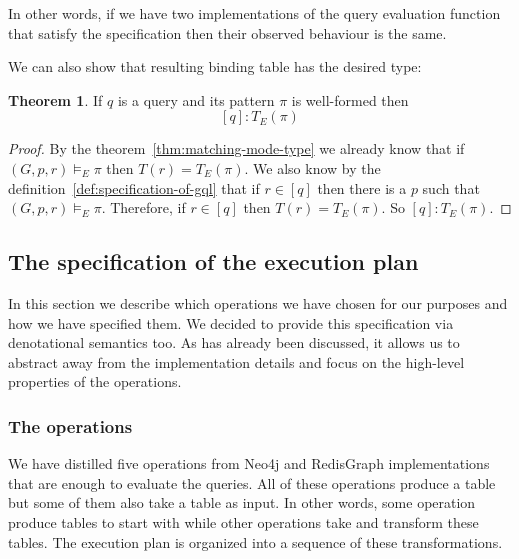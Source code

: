 \documentclass[14pt]{constructor-thesis}
\theoremstyle{definition}
\newtheorem{theorem}{Theorem}
\begin{document}
In other words, if we have two implementations of the query evaluation function that satisfy the specification then their observed behaviour is the same.

We can also show that resulting binding table has the desired type:
\begin{theorem}
  If $q$ is a query and its pattern $\pi$ is well-formed then
  $$[q] : T_E(\pi)$$
\end{theorem}
\begin{proof}
  By the theorem~\ref{thm:matching-mode-type} we already know that if $(G, p, r) \models_E \pi$ then $T(r) = T_E(\pi)$. We also know by the definition~\ref{def:specification-of-gql} that if $r \in [q]$ then there is a $p$ such that $(G, p, r) \models_E \pi$. Therefore, if $r \in [q]$ then $T(r) = T_E(\pi)$. So $[q] : T_E(\pi)$.
\end{proof}

\subsection{The specification of the execution plan}

In this section we describe which operations we have chosen for our purposes and how we have specified them. We decided to provide this specification via denotational semantics too. As has already been discussed, it allows us to abstract away from the implementation details and focus on the high-level properties of the operations.

\subsubsection{The operations}

We have distilled five operations from Neo4j and RedisGraph implementations that are enough to evaluate the queries. All of these operations produce a table but some of them also take a table as input. In other words, some operation produce tables to start with while other operations take and transform these tables. The execution plan is organized into a sequence of these transformations.
\end{document}
